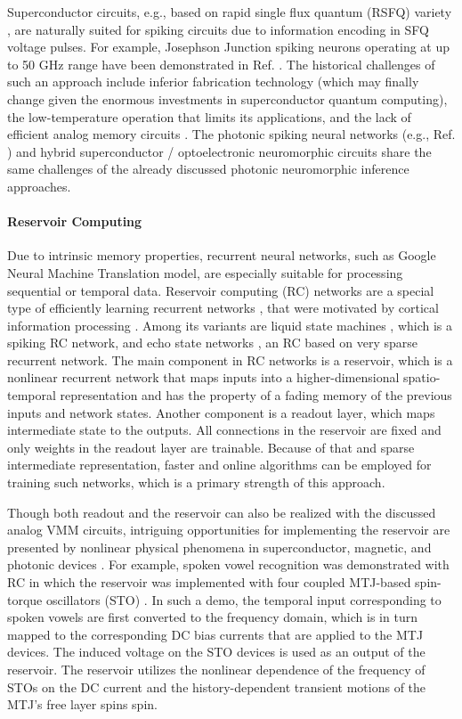 Superconductor circuits, e.g., based on rapid single flux quantum (RSFQ) variety \cite{Likharev1991}, are naturally suited for spiking circuits due to information encoding in SFQ voltage pulses. For example, Josephson Junction spiking neurons operating at up to 50 GHz range have been demonstrated in Ref. \cite{Segall2017}. The historical challenges of such an approach include inferior fabrication technology (which may finally change given the enormous investments in superconductor quantum computing), the low-temperature operation that limits its applications, and the lack of efficient analog memory circuits \cite{Likharev2012}. The photonic spiking neural networks (e.g., Ref. \cite{Feldmann2019}) and hybrid superconductor / optoelectronic neuromorphic circuits \cite{Buckley2017} share the same challenges of the already discussed photonic neuromorphic inference approaches.


\paragraph*{Reservoir Computing}

Due to intrinsic memory properties, recurrent neural networks, such as Google Neural Machine Translation model, are especially suitable for processing sequential or temporal data. Reservoir computing (RC) networks are a special type of efficiently learning recurrent networks \cite{Lukosevicius2009}, that were motivated by cortical information processing \cite{Maas2004}. Among its variants are liquid state machines \cite{Maass2002}, which is a spiking RC network, and echo state networks \cite{Jaeger2001}, an RC based on very sparse recurrent network. The main component in RC networks is a reservoir, which is a nonlinear recurrent network that maps inputs into a higher-dimensional spatio-temporal representation and has the property of a fading memory of the previous inputs and network states. Another component is a readout layer, which maps intermediate state to the outputs. All connections in the reservoir are fixed and only weights in the readout layer are trainable. Because of that and sparse intermediate representation, faster and online algorithms can be employed for training such networks, which is a primary strength of this approach.

Though both readout and the reservoir can also be realized with the discussed analog VMM circuits, intriguing opportunities for implementing the reservoir are presented by nonlinear physical phenomena in superconductor, magnetic, and photonic devices \cite{Tanaka2019}. For example, spoken vowel recognition was demonstrated with RC in which the reservoir was implemented with four coupled MTJ-based spin-torque oscillators (STO) \cite{Romera2018}. In such a demo, the temporal input corresponding to spoken vowels are first converted to the frequency domain, which is in turn mapped to the corresponding DC bias currents that are applied to the MTJ devices. The induced voltage on the STO devices is used as an output of the reservoir. The reservoir utilizes the nonlinear dependence of the frequency of STOs on the DC current and the history-dependent transient motions of the MTJ's free layer spins spin. 

